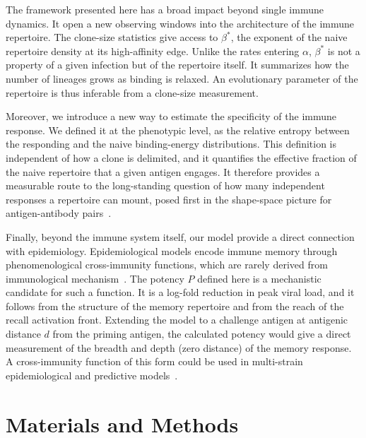 \documentclass[aps, pre, twocolumn, 10pt, groupedaddress, superscriptaddress, linenumbers]{revtex4-2}
\begin{document}
The framework presented here has a broad impact beyond single immune dynamics. 
It open a new observing windows into the architecture of the immune repertoire.
The clone-size statistics give access to $\beta^*$, the exponent of the naive repertoire density at its high-affinity edge.
Unlike the rates entering $\alpha$, $\beta^*$ is not a property of a given infection but of the repertoire itself.
It summarizes how the number of lineages grows as binding is relaxed.
An evolutionary parameter of the repertoire is thus inferable from a clone-size measurement.

Moreover, we introduce a new way to estimate the specificity of the immune response.
We defined it at the phenotypic level, as the relative entropy between the responding and the naive binding-energy distributions.
This definition is independent of how a clone is delimited, and it quantifies the effective fraction of the naive repertoire that a given antigen engages.
It therefore provides a measurable route to the long-standing question of how many independent responses a repertoire can mount, posed first in the shape-space picture for antigen-antibody pairs~\cite{perelsonOsterTheoreticalStudies1979, Perelson_1997_Review}.


Finally, beyond the immune system itself, our model provide a direct connection with epidemiology.
Epidemiological models encode immune memory through phenomenological cross-immunity functions, which are rarely derived from immunological mechanism~\cite{gogGrenfellDynamicsMultistrain2002, grenfellUnifyingEpidemiologicalEvolutionary2004}.
The potency $P$ defined here is a mechanistic candidate for such a function.
It is a log-fold reduction in peak viral load, and it follows from the structure of the memory repertoire and from the reach of the recall activation front.
Extending the model to a challenge antigen at antigenic distance $d$ from the priming antigen, the calculated potency would give a direct measurement of the breadth and depth (zero distance) of the memory response.
A cross-immunity function of this form could be used in multi-strain epidemiological and predictive models~\cite{fonvilleAntibodyLandscapes2014, luksza_predictive_2014, yanShraimanNeher2019, marchiAntigenicWaves2021}.


\section*{Materials and Methods}
\end{document}

